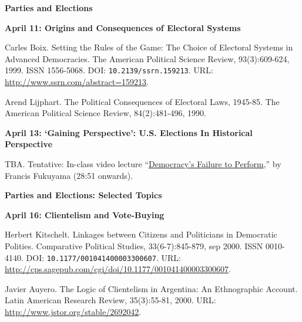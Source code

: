 \documentclass[letterpaper]{article}
\renewenvironment{itemize}{
  \begin{list}{}{
    \setlength{\leftmargin}{1.5em}
  }
}{
  \end{list}
}
\begin{document}
\begin{enumerate}
\item {\bf Parties and Elections}
	\begin{itemize} 
		\item {\bf April 11: Origins and Consequences of Electoral Systems}
			\begin{itemize} 
				\item[$\bullet$] Carles Boix. Setting the Rules of the Game: The Choice of Electoral Systems in Advanced Democracies. The American Political Science Review, 93(3):609-624, 1999. ISSN 1556-5068. DOI: \texttt{10.2139/ssrn.159213}. URL: \url{http://www.ssrn.com/abstract=159213}.
				\item[$\bullet$] Arend Lijphart. The Political Consequences of Electoral Laws, 1945-85. The American Political Science Review, 84(2):481-496, 1990.
			\end{itemize}
		\item {\bf April 13: `Gaining Perspective': U.S. Elections In Historical Perspective}
			\begin{itemize}
				\item[$\bullet$] TBA. Tentative: In-class video lecture ``\href{https://www.youtube.com/watch?v=gF8CJSQf238}{Democracy's Failure to Perform},'' by Francis Fukuyama (28:51 onwards).
			\end{itemize}
	\end{itemize}


\item {\bf Parties and Elections: Selected Topics}
	\begin{itemize} 
		\item {\bf April 16: Clientelism and Vote-Buying}
		\begin{itemize}
			\item[$\bullet$] Herbert Kitschelt. Linkages between Citizens and Politicians in Democratic Polities. Comparative Political Studies, 33(6-7):845-879, sep 2000. ISSN 0010-4140. DOI: \texttt{10.1177/001041400003300607}. URL: \url{http://cps.sagepub.com/cgi/doi/10.1177/001041400003300607}.
			\item[$\bullet$] Javier Auyero. The Logic of Clientelism in Argentina: An Ethnographic Account. Latin American Research Review, 35(3):55-81, 2000. URL: \url{http://www.jstor.org/stable/2692042}.
		\end{itemize}
	\end{itemize}



\end{enumerate}
\end{document}
